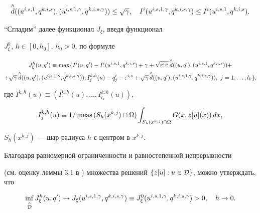 \begin{equation}\label{2dis94}


\up{\wedge}{d}((u^{i,s,1},q^{k,i,s}),(u^{i,s,1,\gamma},


q^{k,i,s,\gamma}))\leq\sqrt\gamma,


\quad I^i(u^{i,s,1,\gamma},q^{k,i,s,\gamma})\leq I^i(u^{i,s,1},q^{k,i,s}).


\end{equation}





``Сгладим'' далее функционал $J_\xi$, введя функционал


$J_\xi^h$, $h\in [0,h_0]$, $h_0>0$, по формуле


\begin{multline*}


J_\xi^h(u,q')\equiv\max\{I^i(u,q')-I^i(u^{i,s,1},q^{k,i,s})+


\gamma+


\sqrt{r^{i,s}}\,\up{\wedge}{d}((u,q'),(u^{i,s,1},q^{k,i,s}))+\\


%


+\sqrt\gamma\,\up{\wedge}{d}((u,q'),(u^{i,s,1,\gamma},q^{k,i,s,\gamma})),


I_j^{k,h}(u)-q_j'-\varepsilon^{i,s}+


\sqrt\gamma\,\up{\wedge}{d}((u,q'),(u^{i,s,1,\gamma},q^{k,i,s,\gamma})),


\ j=1,\dotsc,l_k\},


\end{multline*}


где $I^{k,h}(u)\equiv(I^{k,h}_1(u),\dotsc,I^{k,h}_{l_k}(u))$,


$$


I^{k,h}_j(u)\equiv 1/\meas\,(S_h(x^{k,j})\cap\Omega)\int_{S_h(x^{k,j})


\cap\Omega}G(x,z[u](x))\,dx,


$$


$S_h(x^{k,j})$ --- шар радиуса $h$ с центром в $x^{k,j}$.





Благодаря равномерной ограниченности и равностепенной непрерывности


(см. оценку леммы 3.1 в \cite{sumin98}) множества решений $\{z[u]:u\in


{\cal D}\}$, можно утверждать, что


\begin{equation}\label{2dis95}


\inf_{\up{\wedge}{\cal D}}J_\xi^h(u,q')\to


J_\xi(u^{i,s,1,\gamma},q^{k,i,s,\gamma})\equiv


J_\xi^0(u^{i,s,1,\gamma},q^{k,i,s,\gamma})>0,\quad h\to 0.


\end{equation}


